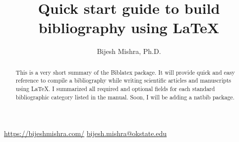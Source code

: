 \documentclass{article}
\title{Quick start guide to build bibliography using \LaTeX}
\author{Bijesh Mishra, Ph.D.}
\begin{document}
\maketitle
\begin{center}
 \href{https://bijeshmishra.com/}{https://bijeshmishra.com/}
\hspace{2cm} 
 \href{mailto:bijesh.mishra@okstate.edu}
{bijesh.mishra@okstate.edu}
\end{center}

\begin{abstract}
This is a very short summary of the Biblatex package. It will provide quick and easy reference to compile a bibliography while writing scientific articles and manuscripts using \LaTeX. I summarized all required and optional fields for each standard bibliographic category listed in the manual. Soon, I will be adding a natbib package.
\end{abstract}
\end{document}
